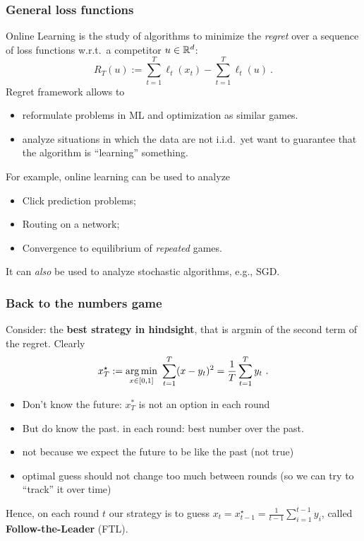 \documentclass{beamer}
\begin{document}
\begin{frame}
  \frametitle{General loss functions}
  Online Learning is the study of algorithms to minimize the \emph{regret} over a sequence of loss functions w.r.t.\ a competitor $u \in \mathbb{R}^d$:
  \[
    R_T(u):=\sum_{t=1}^T \ell_t(x_t) - \sum_{t=1}^T \ell_t(u)~.
  \]
  Regret framework allows to
  \begin{itemize}
    \item reformulate problems in ML and optimization as similar games.
    \item analyze situations in which the data are not i.i.d.\, yet want to guarantee that the algorithm is ``learning'' something.
  \end{itemize}

  For example, online learning can be used to analyze
  \begin{itemize}
    \item Click prediction problems;
    \item Routing on a network;
    \item Convergence to equilibrium of \textit{repeated} games.
  \end{itemize}
  It can \emph{also} be used to analyze stochastic algorithms, e.g., SGD.
\end{frame}


\begin{frame}
  \frametitle{Back to the numbers game}
  Consider: the \textbf{best strategy in hindsight}, that is argmin of the second term of the regret. Clearly
  \[
    x^\star_T := \operatorname*{arg\,min}_{x \in [0,1]} \ \sum_{t=1}^T (x - y_t)^2 = \frac{1}{T} \sum_{t=1}^T y_t~.
  \]
  \begin{itemize}
    \item Don't know the future: $x^*_T$ is not an option in each round
    \item But do know the past. in each round: best number over the past.
    \item not because we expect the future to be like the past (not true)
    \item optimal guess should not change too much between rounds (so we can try to ``track'' it over time)
  \end{itemize}
  Hence, on each round $t$ our strategy is to guess $x_t = x_{t-1}^\star=\frac{1}{t-1} \sum_{i=1}^{t-1} y_i$, called \textbf{Follow-the-Leader} (FTL).
\end{frame}
\end{document}
